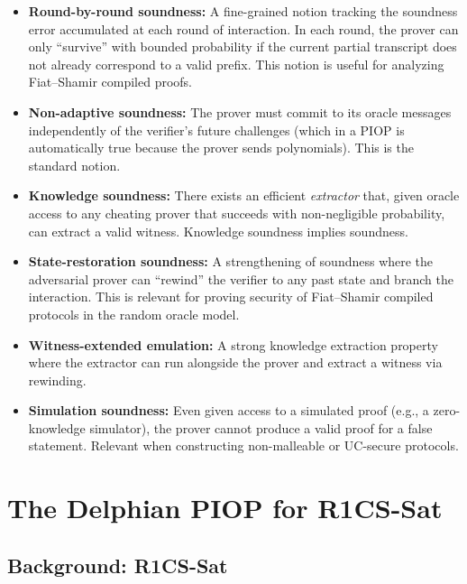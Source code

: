 \documentclass[11pt]{article}
\begin{document}
\begin{itemize}
  \item \textbf{Round-by-round soundness:} A fine-grained notion tracking the
    soundness error accumulated at each round of interaction. In each round, the
    prover can only ``survive'' with bounded probability if the current partial
    transcript does not already correspond to a valid prefix. This notion is
    useful for analyzing Fiat--Shamir compiled proofs.

  \item \textbf{Non-adaptive soundness:} The prover must commit to its oracle
    messages independently of the verifier's future challenges (which in a
    PIOP is automatically true because the prover sends polynomials). This is
    the standard notion.

  \item \textbf{Knowledge soundness:} There exists an efficient \emph{extractor}
    that, given oracle access to any cheating prover that succeeds with
    non-negligible probability, can extract a valid witness. Knowledge soundness
    implies soundness.

  \item \textbf{State-restoration soundness:} A strengthening of soundness where
    the adversarial prover can ``rewind'' the verifier to any past state and
    branch the interaction. This is relevant for proving security of
    Fiat--Shamir compiled protocols in the random oracle model.

  \item \textbf{Witness-extended emulation:} A strong knowledge extraction
    property where the extractor can run alongside the prover and extract a
    witness via rewinding.

  \item \textbf{Simulation soundness:} Even given access to a simulated proof
    (e.g., a zero-knowledge simulator), the prover cannot produce a valid proof
    for a false statement. Relevant when constructing non-malleable or
    UC-secure protocols.
\end{itemize}

\section{The Delphian PIOP for R1CS-Sat}

\subsection{Background: R1CS-Sat}
\end{document}

